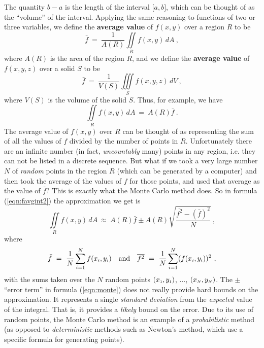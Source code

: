 The quantity $b-a$ is the length of the interval $\lbrack a,b \rbrack$, which can be thought of as the ``volume'' of
the interval. Applying the same reasoning to functions of two or three variables, we define the \textbf{average
value} of $f(x,y)$ over a region $R$ to be
\begin{equation}\label{eqn:favg2}
 \bar{f} ~=~ \frac{1}{A(R)}\iint\limits_{R} f(x,y)\,dA ~,
\end{equation}
where $A(R)$ is the area of the region $R$, and we define the \textbf{average
value} of $f(x,y,z)$ over a solid $S$ to be
\begin{equation}\label{eqn:favg3}
 \bar{f} ~=~ \frac{1}{V(S)}\iiint\limits_{S} f(x,y,z)\,dV ~,
\end{equation}
where $V(S)$ is the volume of the solid $S$. Thus, for example, we have
\begin{equation}\label{eqn:favgint2}
 \iint\limits_{R} f(x,y)\,dA ~=~ A(R)\bar{f} ~.
\end{equation}
The average value of $f(x,y)$ over $R$ can be thought of as representing the sum of all the values of $f$ divided by
the number of points in $R$. Unfortunately there are an infinite number (in fact, \emph{uncountably} many) points
in any region, i.e. they can not be listed in a discrete sequence. But what if we took a
very large number $N$ of \emph{random} points in the region $R$ (which can be generated by a computer) and then took the
average of the values of $f$ for those points, and used that
average as the value of $\bar{f}$? This is exactly what the Monte Carlo method does. So in formula (\ref{eqn:favgint2})
the approximation we get is
\begin{equation}\label{eqn:monte}
 \iint\limits_{R} f(x,y)\,dA ~\approx~ A(R)\bar{f} \pm A(R)\sqrt{\frac{\overline{f^2} - (\bar{f})^2}{N}} ~,
\end{equation}
where
\begin{equation}
 \bar{f} ~=~ \frac{1}{N}\sum_{i=1}^N f(x_{\scriptscriptstyle i},y_{\scriptscriptstyle i}) \quad \text{and} \quad \overline{f^2} ~=~
 \frac{1}{N} \sum_{i=1}^N (f(x_{\scriptscriptstyle i},y_{\scriptscriptstyle i}))^2~,
\end{equation}
with the sums taken over the $N$ random points $(x_{\scriptscriptstyle 1},y_{\scriptscriptstyle 1})$, $\ldots$, $(x_{\scriptscriptstyle N},y_{\scriptscriptstyle N})$.
The $\pm$ ``error term'' in formula (\ref{eqn:monte}) does not really provide
hard bounds on the approximation. It represents a single \emph{standard deviation} from the \emph{expected} value of the
integral. That is, it provides a \emph{likely} bound on the error. Due to its use of random points, the Monte Carlo
method is an example of a \emph{probabilistic} method (as opposed to \emph{deterministic} methods such as Newton's
method, which use a specific formula for generating points).


